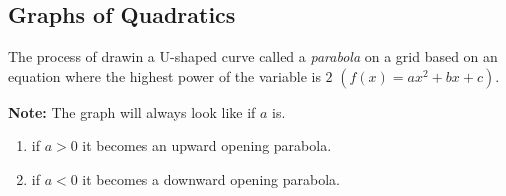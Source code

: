 \subsection{Graphs of Quadratics}
\begin{definition}
  The process of drawin a U-shaped curve called a \textit{parabola} on a grid based on an equation where the highest power of the variable is $2$ $(f(x) = ax^2 + bx + c)$.
\end{definition}
\textbf{Note: }The graph will always look like if $a$ is. 
\begin{enumerate}
\item if $a > 0$ it becomes an upward opening parabola. \\
  \begin{center}
  \end{center}
\item if $a < 0$ it becomes a downward opening parabola. \\
  \begin{center}
  \end{center}
\end{enumerate}


